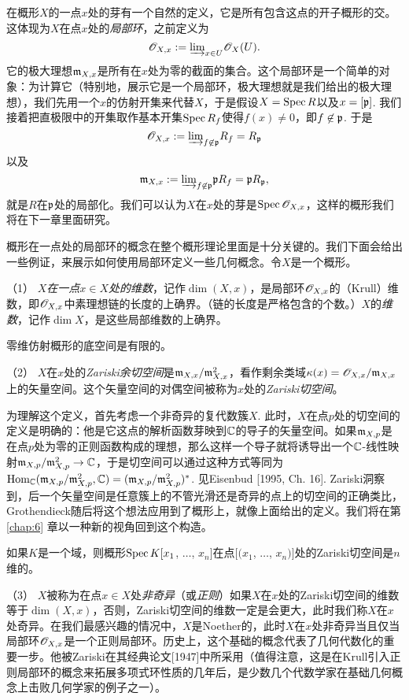 在概形$X$的一点$x$处的芽有一个自然的定义，它是所有包含这点的开子概形的交。这体现为$X$在点$x$处的\textit{局部环}，之前定义为
\[
	\mathscr{O}_{X,x}:={\varinjlim}_{x\in U}\mathscr{O}_X(U).
\]
它的极大理想$\mathfrak{m}_{X,x}$是所有在$x$处为零的截面的集合。这个局部环是一个简单的对象：为计算它（特别地，展示它是一个局部环，极大理想就是我们给出的极大理想），我们先用一个$x$的仿射开集来代替$X$，于是假设$X=\operatorname{Spec} R$以及$x=[\mathfrak{p}]$. 我们接着把直极限中的开集取作基本开集$\operatorname{Spec} R_f$使得$f(x)\neq 0$，即$f\not\in \mathfrak{p}$. 于是
\[
	\mathscr{O}_{X,x}:={\varinjlim}_{f\not\in \mathfrak{p}}R_f=R_{\mathfrak{p}}
\]
以及
\[
	\mathfrak{m}_{X,x}:={\varinjlim}_{f\not\in \mathfrak{p}}\mathfrak{p} R_f=\mathfrak{p} R_{\mathfrak{p}},
\]
就是$R$在$\mathfrak{p}$处的局部化。我们可以认为$X$在$x$处的芽是$\operatorname{Spec} \mathscr{O}_{X,x}$，这样的概形我们将在下一章里面研究。

概形在一点处的局部环的概念在整个概形理论里面是十分关键的。我们下面会给出一些例证，来展示如何使用局部环定义一些几何概念。令$X$是一个概形。

\vspace{0.5em}
（1） \textit{$X$在一点$x\in X$处的维数}，记作$\dim(X,x)$，是局部环$\mathscr{O}_{X,x}$的（Krull）维数，即$\mathscr{O}_{X,x}$中素理想链的长度的上确界。（链的长度是严格包含的个数。）$X$的\textit{维数}，记作$\dim X$，是这些局部维数的上确界。

\begin{exe}
	零维仿射概形的底空间是有限的。
\end{exe}

（2） $X$在$x$处的\textit{Zariski余切空间}是$\mathfrak{m}_{X,x}/\mathfrak{m}_{X,x}^2$，看作剩余类域$\kappa(x)=\mathscr{O}_{X,x}/\mathfrak{m}_{X,x}$上的矢量空间。这个矢量空间的对偶空间被称为$x$处的\textit{Zariski切空间}。

为理解这个定义，首先考虑一个非奇异的复代数簇$X$. 此时，$X$在点$p$处的切空间的定义是明确的：他是它这点的解析函数芽映到$\mathbb{C}$的导子的矢量空间。如果$\mathfrak{m}_{X,p}$是在点$p$处为零的正则函数构成的理想，那么这样一个导子就将诱导出一个$\mathbb{C}$-线性映射$\mathfrak{m}_{X,p}/\mathfrak{m}_{X,p}^2\to \mathbb{C}$，于是切空间可以通过这种方式等同为$\operatorname{Hom}_{\mathbb{C}}(\mathfrak{m}_{X,p}/\mathfrak{m}_{X,p}^2,\mathbb{C})=(\mathfrak{m}_{X,p}/\mathfrak{m}_{X,p}^2)^*$. 见Eisenbud [1995, Ch. 16]. Zariski洞察到，后一个矢量空间是任意簇上的不管光滑还是奇异的点上的切空间的正确类比，Grothendieck随后将这个想法应用到了概形上，就像上面给出的定义。我们将在第 \ref{chap:6} 章以一种新的视角回到这个构造。

\begin{exe}
如果$K$是一个域，则概形$\operatorname{Spec} K[x_1$, $\dots$, $x_n]$在点$[(x_1$, $\dots$, $x_n)]$处的Zariski切空间是$n$维的。
\end{exe}

（3） $X$被称为在点$x\in X$处\textit{非奇异}（或\textit{正则}）如果$X$在$x$处的Zariski切空间的维数等于$\dim(X,x)$，否则，Zariski切空间的维数一定是会更大，此时我们称$X$在$x$处奇异。在我们最感兴趣的情况中，$X$是Noether的，此时$X$在$x$处非奇异当且仅当局部环$\mathscr{O}_{X,x}$是一个正则局部环。历史上，这个基础的概念代表了几何代数化的重要一步。他被Zariski在其经典论文[1947]中所采用（值得注意，这是在Krull引入正则局部环的概念来拓展多项式环性质的几年后，是少数几个代数学家在基础几何概念上击败几何学家的例子之一）。

